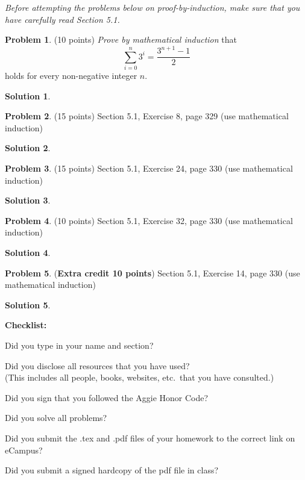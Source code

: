 \documentclass{article}
\theoremstyle{definition}
\newtheorem{problem}{Problem}
\newtheorem*{solution}{Solution}
\newcommand{\checklist}{\noindent\textbf{Checklist:}
\begin{compactitem}[$\Box$] 
\item Did you type in your name and section? 
\item Did you disclose all resources that you have used? \\
(This includes all people, books, websites, etc.\ that you have consulted.)
\item Did you sign that you followed the Aggie Honor Code? 
\item Did you solve all problems? 
\item Did you submit the .tex and .pdf files of your homework to the correct link on eCampus?
\item Did you submit a signed hardcopy of the pdf file in class? 
\end{compactitem}
}
\begin{document}
\noindent
\textsl{Before attempting the problems below on proof-by-induction, make sure that 
you have carefully read Section 5.1.}

\begin{problem} (10 points) \textsl{Prove by mathematical induction} that
$$\sum_{i=0}^n 3^i = \frac{3^{n+1}-1}{2}$$
holds for every non-negative integer $n$.
\end{problem}
\begin{solution}
\end{solution}

\begin{problem} (15 points)
Section 5.1, Exercise 8, page 329 (use mathematical induction)
\end{problem}
\begin{solution} 
\end{solution}

\begin{problem} (15 points)
Section 5.1, Exercise 24, page 330 (use mathematical induction)
\end{problem}
\begin{solution} 
\end{solution}

\begin{problem} (10 points)
Section 5.1, Exercise 32, page 330 (use mathematical induction)
\end{problem}
\begin{solution} 
\end{solution}

\begin{problem} (\textbf{Extra credit 10 points})
Section 5.1, Exercise 14, page 330 (use mathematical induction)
\end{problem}
\begin{solution} 
\end{solution}

\goodbreak
\checklist
\end{document}
